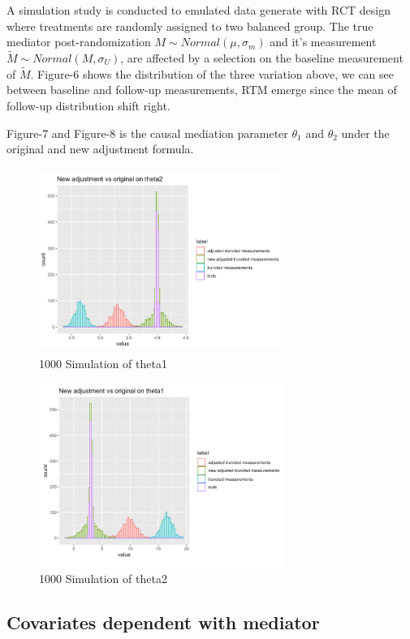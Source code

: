 \documentclass{article}
\begin{document}
A simulation study is conducted to emulated data generate with RCT design where treatments are randomly assigned to two balanced group.  The true mediator post-randomization $M \sim Normal (\mu, \sigma_{m}) $ and it's measurement $\tilde M \sim Normal (M, \sigma_U)$, are affected by a selection on the baseline measurement of $\tilde M$. Figure-6 shows the distribution of the three variation above, we can see between baseline and follow-up measurements, RTM emerge since the mean of follow-up distribution shift right. 

Figure-7 and Figure-8 is the causal mediation parameter $\theta_1$ and $\theta_2$ under the original and new adjustment formula.


\begin{figure}[h]
\centering
\includegraphics[width = 8cm,height = 6cm]{figure-5.png}
\caption{1000 Simulation of theta1}
\label{fig5}
\end{figure}



\begin{figure}[h]
\centering
\includegraphics[width = 8cm,height = 6cm]{figure-6.png}
\caption{1000 Simulation of theta2 }
\label{fig6}
\end{figure}



\subsection{Covariates dependent with mediator}
\end{document}
